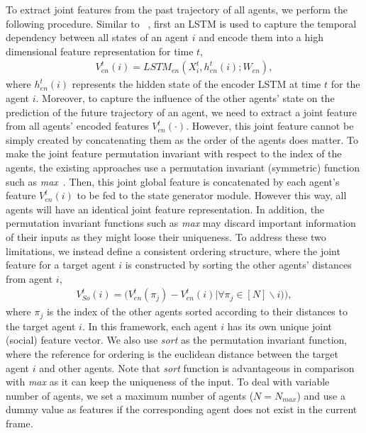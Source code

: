 \documentclass[10pt,twocolumn,letterpaper]{article}
\begin{document}
To extract joint features from the past trajectory of all agents, we perform the following procedure. Similar to ~\cite{gupta2018social}, first an LSTM is used to capture the temporal dependency between all states of an agent $i$ and encode them into a high dimensional feature representation for time $t$, \ie
\begin{eqnarray}
\label{eq:Feature_extractors2}
V^t_{en}(i) = LSTM_{en}(X^{t}_{i}, h_{en}^{t}(i); W_{en}),
\end{eqnarray}
where $h_{en}^{t}(i)$ represents the hidden state of the encoder LSTM at time $t$ for the agent $i$.
Moreover, to capture the influence of the other agents' state on the prediction of the future trajectory of an agent, we need to extract a joint feature from all agents' encoded features $V^t_{en}(\cdot)$. However, this joint feature cannot be simply created by concatenating them as the order of the agents does matter. To make the joint feature permutation invariant with respect to the index of the agents, the existing approaches use a permutation invariant (symmetric) function such as \emph{max}~\cite{gupta2018social}. Then, this joint global feature is concatenated by each agent's feature $V^t_{en}(i)$ to be fed to the state generator module. However this way, all agents will have an identical joint feature representation. In addition, the permutation invariant functions such as \emph{max} may discard important information of their inputs as they might loose their uniqueness. To address these two limitations, we instead define a consistent ordering structure, where the joint feature for a target agent $i$ is constructed by sorting the other agents' distances from agent $i$, \ie
\begin{eqnarray}
\label{eq:Feature_extractors3}
V^t_{So}(i) = \big(V^t_{en}(\pi_j) - V^t_{en}(i) \big| \forall \pi_j\in[N]\backslash i)\big),
\end{eqnarray}
where $\pi_j$ is the index of the other agents sorted according to their distances to the target agent $i$. In this framework, each agent $i$ has its own unique joint (social) feature vector. We also use \emph{sort} as the permutation invariant function, where the reference for ordering is the euclidean distance between the target agent $i$ and other agents. Note that \emph{sort} function is advantageous in comparison with \emph{max} as it can keep the uniqueness of the input.    
To deal with variable number of agents, we set a maximum number of agents ($N = N_{max}$) and use a dummy value as features if the corresponding agent does not exist in the current frame. 
\end{document}
